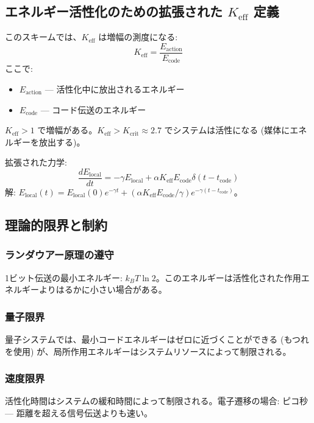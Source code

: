 \documentclass[11pt,a4paper]{article}
\begin{document}
	\subsection{エネルギー活性化のための拡張された $K_{\mathrm{eff}}$ 定義}
	
	このスキームでは、$K_{\mathrm{eff}}$ は増幅の測度になる:
	\begin{equation}
		K_{\mathrm{eff}} = \frac{E_{\text{action}}}{E_{\text{code}}}
	\end{equation}
	ここで:
	\begin{itemize}
		\item $E_{\text{action}}$ — 活性化中に放出されるエネルギー
		\item $E_{\text{code}}$ — コード伝送のエネルギー
	\end{itemize}
	
	$K_{\mathrm{eff}} > 1$ で増幅がある。$K_{\mathrm{eff}} > K_{\text{crit}} \approx 2.7$ でシステムは活性になる (媒体にエネルギーを放出する)。
	
	拡張された力学:
	\begin{equation}
		\frac{dE_{\text{local}}}{dt} = -\gamma E_{\text{local}} + \alpha K_{\mathrm{eff}} E_{\text{code}} \delta(t - t_{\text{code}})
	\end{equation}
	解: $E_{\text{local}}(t) = E_{\text{local}}(0) e^{-\gamma t} + (\alpha K_{\mathrm{eff}} E_{\text{code}}/\gamma) e^{-\gamma(t-t_{\text{code}})}$。
	
	\subsection{理論的限界と制約}
	
	\subsubsection{ランダウアー原理の遵守}
	1ビット伝送の最小エネルギー: $k_B T \ln 2$。このエネルギーは活性化された作用エネルギーよりはるかに小さい場合がある。
	
	\subsubsection{量子限界}
	量子システムでは、最小コードエネルギーはゼロに近づくことができる (もつれを使用) が、局所作用エネルギーはシステムリソースによって制限される。
	
	\subsubsection{速度限界}
	活性化時間はシステムの緩和時間によって制限される。電子遷移の場合: ピコ秒 — 距離を超える信号伝送よりも速い。
	
\end{document}
